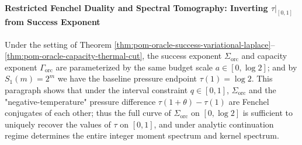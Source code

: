 \paragraph{Restricted Fenchel Duality and Spectral Tomography: Inverting \texorpdfstring{$\tau|_{[0,1]}$}{tau on [0,1]} from Success Exponent}
Under the setting of Theorem \ref{thm:pom-oracle-success-variational-laplace}--\ref{thm:pom-oracle-capacity-thermal-cut}, the success exponent \(\Sigma_{\mathrm{orc}}\) and capacity exponent \(\Gamma_{\mathrm{orc}}\) are parameterized by the same budget scale \(a\in[0,\log 2]\);
and by \(S_1(m)=2^m\) we have the baseline pressure endpoint \(\tau(1)=\log 2\).
This paragraph shows that under the interval constraint \(q\in[0,1]\), \(\Sigma_{\mathrm{orc}}\) and the "negative-temperature" pressure difference \(\tau(1+\theta)-\tau(1)\) are Fenchel conjugates of each other;
thus the full curve of \(\Sigma_{\mathrm{orc}}\) on \([0,\log 2]\) is sufficient to uniquely recover the values of \(\tau\) on \([0,1]\), and under analytic continuation regime determines the entire integer moment spectrum and kernel spectrum.

